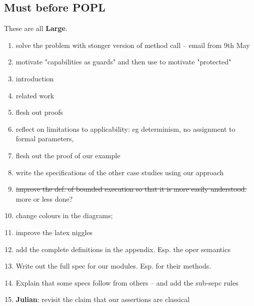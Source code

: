 \documentclass[acmsmall,review,anonymous]{acmart}\settopmatter{printfolios=true}
\begin{document}
 \subsection{Must before POPL}

These are all \textbf{Large}.

\begin{enumerate}
\item
  solve the problem with stonger version of method call -- email from 9th May

\item
motivate "capabilities as guards" and then use to motivate "protected"
\item
introduction
\item
related work
\item
flesh out proofs
\item
reflect on limitations to applicability: eg determinism, no assignment to formal parameters, 
\item
flesh out the proof of our example
\item
write the specifications of the other case studies using our approach
\item
\st{improve the def. of bounded execution so that it is more easily understood.} more or less done?
\item
change colours in the diagrams; 
\item
improve the latex niggles 
\item
add the complete definitions in the appendix. Esp. the oper semantics
\item
Write out the full spec for our modules. Esp. for their methods.

\item
Explain that some specs follow from others -- and add the sub-sepc rules

\item 
\textbf{Julian}: revisit the claim that our assertions are classical
\end{enumerate}
 
\end{document}

